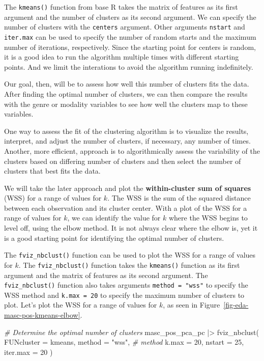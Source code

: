 \documentclass[
  letterpaper,
]{latex/krantz}
\newenvironment{Shaded}{\begin{snugshade}}{\end{snugshade}}
\newcommand{\AttributeTok}[1]{\textcolor[rgb]{0.00,0.00,0.00}{#1}}
\newcommand{\CommentTok}[1]{\textcolor[rgb]{0.00,0.00,0.00}{\textit{#1}}}
\newcommand{\DecValTok}[1]{\textcolor[rgb]{0.00,0.00,0.00}{#1}}
\newcommand{\FunctionTok}[1]{\textcolor[rgb]{0.00,0.00,0.00}{#1}}
\newcommand{\NormalTok}[1]{\textcolor[rgb]{0.00,0.00,0.00}{#1}}
\newcommand{\SpecialCharTok}[1]{\textcolor[rgb]{0.00,0.00,0.00}{#1}}
\newcommand{\StringTok}[1]{\textcolor[rgb]{0.00,0.00,0.00}{#1}}
\theoremstyle{definition}
\theoremstyle{remark}
\begin{document}
The \texttt{kmeans()} function from base R takes the matrix of features
as its first argument and the number of clusters as its second argument.
We can specify the number of clusters with the \texttt{centers}
argument. Other arguments \texttt{nstart} and \texttt{iter.max} can be
used to specify the number of random starts and the maximum number of
iterations, respectively. Since the starting point for centers is
random, it is a good idea to run the algorithm multiple times with
different starting points. And we limit the interations to avoid the
algorithm running indefinitely.

Our goal, then, will be to assess how well this number of clusters fits
the data. After finding the optimal number of clusters, we can then
compare the results with the genre or modality variables to see how well
the clusters map to these variables.

One way to assess the fit of the clustering algorithm is to visualize
the results, interpret, and adjust the number of clusters, if necessary,
any number of times. Another, more efficient, approach is to
algorithmically assess the variability of the clusters based on
differing number of clusters and then select the number of clusters that
best fits the data.

We will take the later approach and plot the \textbf{within-cluster sum
of squares} (WSS) for a range of values for \(k\). The WSS is the sum of
the squared distance between each observation and its cluster center.
With a plot of the WSS for a range of values for \(k\), we can identify
the value for \(k\) where the WSS begins to level off, using the elbow
method. It is not always clear where the elbow is, yet it is a good
starting point for identifying the optimal number of clusters.

The \texttt{fviz\_nbclust()} function can be used to plot the WSS for a
range of values for \(k\). The \texttt{fviz\_nbclust()} function takes
the \texttt{kmeans()} function as its first argument and the matrix of
features as its second argument. The \texttt{fviz\_nbclust()} function
also takes arguments \texttt{method\ =\ "wss"} to specify the WSS method
and \texttt{k.max\ =\ 20} to specify the maximum number of clusters to
plot. Let's plot the WSS for a range of values for \(k\), as seen in
Figure~\ref{fig-eda-masc-pos-kmeans-elbow}.

\begin{Shaded}
\begin{Highlighting}[]
\CommentTok{\# Determine the optimal number of clusters}
\NormalTok{masc\_pos\_pca\_pc }\SpecialCharTok{|\textgreater{}}
  \FunctionTok{fviz\_nbclust}\NormalTok{(}
    \AttributeTok{FUNcluster =}\NormalTok{ kmeans,}
    \AttributeTok{method =} \StringTok{"wss"}\NormalTok{, }\CommentTok{\# method}
    \AttributeTok{k.max =} \DecValTok{20}\NormalTok{,}
    \AttributeTok{nstart =} \DecValTok{25}\NormalTok{,}
    \AttributeTok{iter.max =} \DecValTok{20}
\NormalTok{  )}
\end{Highlighting}
\end{Shaded}
\end{document}
